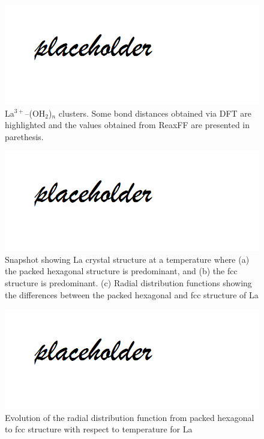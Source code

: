 \documentclass[journal=jpcafh,manuscript=article]{achemso}
\begin{document}
\pagebreak

\begin{figure}[hbtp]
\centering
\includegraphics[scale=0.75]{Paper/images/placeholder.png}
\caption{La$^{3+}$--(OH$_2$)$_n$ clusters. Some bond distances obtained via DFT are highlighted and the values obtained from ReaxFF are presented in parethesis.}
\label{fig:LaOH2clusters}
\end{figure}

\pagebreak

\begin{figure}[hbtp]
\centering
\includegraphics[scale=0.75]{Paper/images/placeholder.png}
\caption{Snapshot showing La crystal structure at a temperature where (a) the packed hexagonal structure is predominant, and (b) the fcc structure is predominant. (c) Radial distribution functions showing the differences between the packed hexagonal and fcc structure of La}
\label{fig:La-alpha-gamma-RDF}
\end{figure}

\pagebreak

\begin{figure}[hbtp]
\centering
\includegraphics[scale=0.75]{Paper/images/placeholder.png}
\caption{Evolution of the radial distribution function from packed hexagonal to fcc structure with respect to temperature for La}
\label{fig:LaRDFevolution}
\end{figure}
\end{document}
